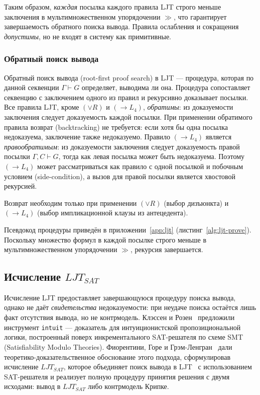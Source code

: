 \documentclass[14pt, russian]{scrartcl}
\begin{document}
Таким образом, \emph{каждая} посылка каждого правила LJT строго меньше
заключения в мультимножественном упорядочении $\gg$, что гарантирует завершаемость
обратного поиска вывода. Правила ослабления и сокращения \emph{допустимы}, но
не входят в систему как примитивные.

\subsubsection{Обратный поиск вывода}

Обратный поиск вывода (root-first proof search) в LJT --- процедура, которая по
данной секвенции $\Gamma \vdash G$ определяет, выводима ли она. Процедура
сопоставляет секвенцию с заключением одного из правил и рекурсивно доказывает
посылки. Все правила LJT, кроме $(\lor R)$ и $(\rightarrow L_4)$,
\emph{обратимы}: из доказуемости заключения следует доказуемость каждой посылки.
При применении обратимого правила возврат (backtracking) не требуется: если
хотя бы одна посылка недоказуема, заключение также недоказуемо. Правило
$(\rightarrow L_4)$ является \emph{правообратимым}: из доказуемости заключения
следует доказуемость правой посылки $\Gamma, C \vdash G$, тогда как левая посылка
может быть недоказуема. Поэтому $(\rightarrow L_4)$ может рассматриваться как
правило с одной посылкой и побочным условием (side-condition), а вызов для правой
посылки является хвостовой рекурсией.

Возврат необходим только при применении $(\lor R)$ (выбор дизъюнкта) и
$(\rightarrow L_4)$ (выбор импликационной клаузы из антецедента).

Псевдокод процедуры приведён в приложении~\ref{app:ljt}
(листинг~\ref{alg:ljt-prove}). Поскольку множество формул в каждой посылке
строго меньше в мультимножественном упорядочении $\gg$, рекурсия завершается.

\subsection{Исчисление $LJT_{SAT}$}

Исчисление LJT предоставляет завершающуюся процедуру поиска вывода, однако не
даёт \emph{свидетельства} недоказуемости: при неудаче поиска остаётся лишь факт
отсутствия вывода, но не контрмодель. Клэссен и Розен~\cite{ClaessenRosen2015}
предложили инструмент \texttt{intuit} --- доказатель для интуиционистской
пропозициональной логики, построенный поверх инкрементального SAT-решателя по
схеме SMT (Satisfiability Modulo Theories). Фиорентини, Горе и
Грэм-Ленгран~\cite{FiorentiniGoreGL2019} дали теоретико-доказательственное
обоснование этого подхода, сформулировав исчисление $LJT_{SAT}$, которое
объединяет поиск вывода в LJT~\cite{Dyckhoff1992} с использованием
SAT-решателя и реализует полную процедуру принятия решения с двумя исходами:
вывод в $LJT_{SAT}$ либо контрмодель Крипке.
\end{document}
